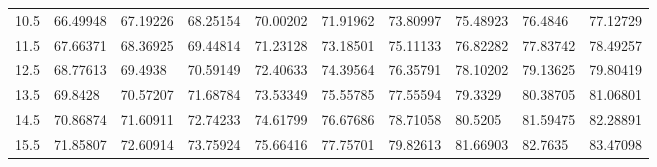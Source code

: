 \documentclass[10pt,twocolumn,letterpaper]{article}
\begin{document}
\begin{table}
\begin{tabular}{llllllllll}
    10.5            & 66.49948                               & 67.19226                               & 68.25154                                & 70.00202                                & 71.91962                                & 73.80997                                & 75.48923                                & 76.4846                                 & 77.12729                                \\
    11.5            & 67.66371                               & 68.36925                               & 69.44814                                & 71.23128                                & 73.18501                                & 75.11133                                & 76.82282                                & 77.83742                                & 78.49257                                \\
    12.5            & 68.77613                               & 69.4938                                & 70.59149                                & 72.40633                                & 74.39564                                & 76.35791                                & 78.10202                                & 79.13625                                & 79.80419                                \\
    13.5            & 69.8428                                & 70.57207                               & 71.68784                                & 73.53349                                & 75.55785                                & 77.55594                                & 79.3329                                 & 80.38705                                & 81.06801                                \\
    14.5            & 70.86874                               & 71.60911                               & 72.74233                                & 74.61799                                & 76.67686                                & 78.71058                                & 80.5205                                 & 81.59475                                & 82.28891                                \\
    15.5            & 71.85807                               & 72.60914                               & 73.75924                                & 75.66416                                & 77.75701                                & 79.82613                                & 81.66903                                & 82.7635                                 & 83.47098                                \\

\end{tabular}
\end{table}
\end{document}
